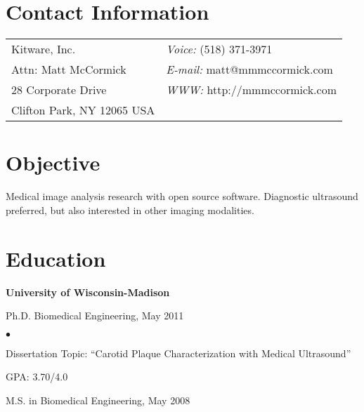 \documentclass[margin,line]{res}
\newenvironment{list1}{
  \begin{list}{\ding{113}}{%
      \setlength{\itemsep}{0in}
      \setlength{\parsep}{0in} \setlength{\parskip}{0in}
      \setlength{\topsep}{0in} \setlength{\partopsep}{0in} 
      \setlength{\leftmargin}{0.17in}}}{\end{list}}
\newenvironment{list2}{
  \begin{list}{$\bullet$}{%
      \setlength{\itemsep}{0in}
      \setlength{\parsep}{0in} \setlength{\parskip}{0in}
      \setlength{\topsep}{0in} \setlength{\partopsep}{0in} 
      \setlength{\leftmargin}{0.2in}}}{\end{list}}
\begin{document}

\begin{resume}
\section{\sc Contact Information}
\vspace{.05in}
\begin{tabular}{@{}p{3in}p{4in}}
Kitware, Inc.                             & {\it Voice:}  (518) 371-3971 \\            
Attn: Matt McCormick                      & {\it E-mail:}  matt@mmmccormick.com \\       
28 Corporate Drive                        & {\it WWW:} http://mmmccormick.com\\     
Clifton Park, NY 12065 USA
\end{tabular}


\section{\sc Objective}
Medical image analysis research with open source software.  Diagnostic
ultrasound preferred, but also interested in other imaging modalities.

\section{\sc Education}
{\bf University of Wisconsin-Madison} \\
\vspace*{-.1in}
\begin{list1}
\item[] Ph.D. Biomedical Engineering, May 2011
\begin{list2}
\vspace*{.05in}
\item Dissertation Topic:  ``Carotid Plaque Characterization with Medical
Ultrasound''
\item GPA: 3.70/4.0
\end{list2}
\vspace*{.05in}
\item[] M.S. in Biomedical Engineering, May 2008
\end{list1}


\end{resume}
\end{document}
